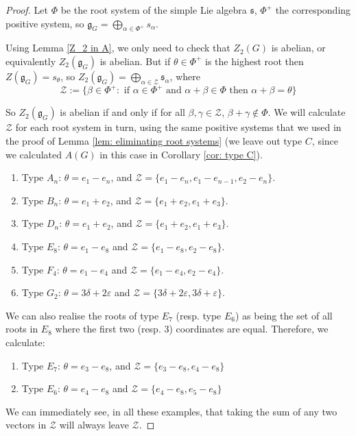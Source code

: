 \documentclass[12pt,a4paper]{article}
\theoremstyle{definition}
\theoremstyle{remark}
\theoremstyle{custthm}
\begin{document}
\begin{proof}

Let $\Phi$ be the root system of the simple Lie algebra $\mathfrak{s}$, $\Phi^+$ the corresponding positive system, so $\mathfrak{g}_G=\underset{\alpha\in\Phi^+}{\bigoplus}{s_{\alpha}}$.

Using Lemma \ref{Z_2 in A}, we only need to check that $Z_2(G)$ is abelian, or equivalently $Z_2(\mathfrak{g}_G)$ is abelian. But if $\theta\in\Phi^+$ is the highest root then $Z(\mathfrak{g}_G)=s_{\theta}$, so $Z_2(\mathfrak{g}_G)=\underset{\alpha\in \mathcal{Z}}{\bigoplus}\mathfrak{s}_\alpha$, where $$\mathcal{Z}:=\{\beta\in\Phi^+:\text{ if }\alpha\in\Phi^+\text{ and }\alpha+\beta\in\Phi\text{ then }\alpha+\beta=\theta\}$$ 

So $Z_2(\mathfrak{g}_G)$ is abelian if and only if for all $\beta,\gamma\in\mathcal{Z}$, $\beta+\gamma\notin\Phi$. We will calculate $\mathcal{Z}$ for each root system in turn, using the same positive systems that we used in the proof of Lemma \ref{lem: eliminating root systems} (we leave out type $C$, since we calculated $A(G)$ in this case in Corollary \ref{cor: type C}).

\begin{enumerate}
    \item Type $A_n$: $\theta=e_1-e_n$, and $\mathcal{Z}=\{e_1-e_n,e_1-e_{n-1},e_2-e_n\}$.

    \item Type $B_n$: $\theta=e_1+e_2$, and $\mathcal{Z}=\{e_1+e_2,e_1+e_3\}$.

    \item Type $D_n$: $\theta=e_1+e_2$, and $\mathcal{Z}=\{e_1+e_2,e_1+e_3\}$.

    \item Type $E_8$: $\theta=e_1-e_8$ and $\mathcal{Z}=\{e_1-e_8,e_2-e_8\}$.

    \item Type $F_4$: $\theta=e_1-e_4$ and $\mathcal{Z}=\{e_1-e_4,e_2-e_4\}$.

    \item Type $G_2$: $\theta=3\delta+2\varepsilon$ and $\mathcal{Z}=\{3\delta+2\varepsilon,3\delta+\varepsilon\}$.
\end{enumerate}

\noindent We can also realise the roots of type $E_7$ (resp. type $E_6$) as being the set of all roots in $E_8$ where the first two (resp. 3) coordinates are equal. Therefore, we calculate:

\begin{enumerate}
    \item Type $E_7$: $\theta=e_3-e_8$, and $\mathcal{Z}=\{e_3-e_8,e_4-e_8\}$

    \item Type $E_6$: $\theta=e_4-e_8$ and $\mathcal{Z}=\{e_4-e_8,e_5-e_8\}$
\end{enumerate}

\noindent We can immediately see, in all these examples, that taking the sum of any two vectors in $\mathcal{Z}$ will always leave $\mathcal{Z}$.\end{proof}
\end{document}
